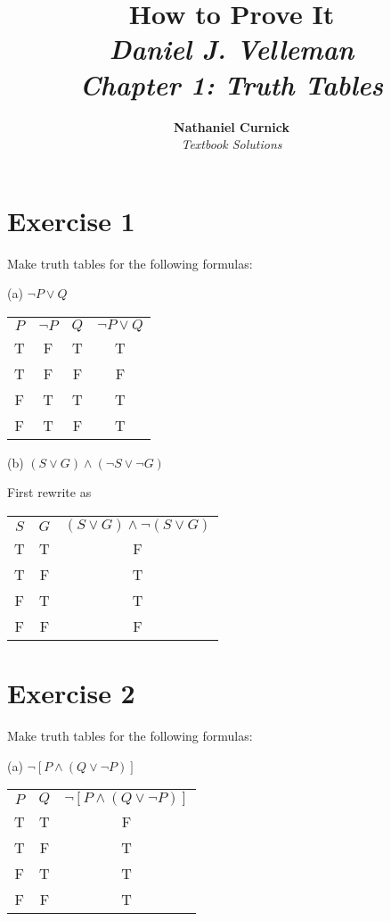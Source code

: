 \documentclass[11pt]{article}
\title{\textbf{How to Prove It} \\ {\Large\itshape Daniel J. Velleman} \\ {\Large\itshape Chapter 1: Truth Tables}}
\author{\textbf{Nathaniel Curnick} \\ \textit{Textbook Solutions}}
\date{}
\begin{document}
\maketitle

\section*{Exercise 1}

Make truth tables for the following formulas:

\noindent (a) $ \neg P \vee Q $

\begin{center}
\begin{tabular}{ c c c c }
 $P$ & $\neg P$ & $Q$ & $ \neg P \vee Q $ \\ 
T & F & T & T\\  
T & F & F & F\\
F & T & T & T\\  
F & T & F & T
\end{tabular}
\end{center}

\noindent (b) $ (S \vee G) \wedge (\neg S \vee \neg G) $

First rewrite as 

\begin{center}
\begin{tabular}{ c c c  }
 $S$ & $G$ & $ (S \vee G) \wedge \neg (S \vee G) $\\ 
T & T & F\\  
T & F & T\\
F & T & T\\  
F & F & F
\end{tabular}
\end{center}

\section*{Exercise 2}
Make truth tables for the following formulas:

\noindent (a) $ \neg [P \wedge (Q \vee \neg P)] $

\begin{center}
\begin{tabular}{ c c c  }
 $P$ & $Q$ & $ \neg [P \wedge (Q \vee \neg P)] $\\ 
T & T & F\\  
T & F & T\\
F & T & T\\  
F & F & T
\end{tabular}
\end{center}
\end{document}
